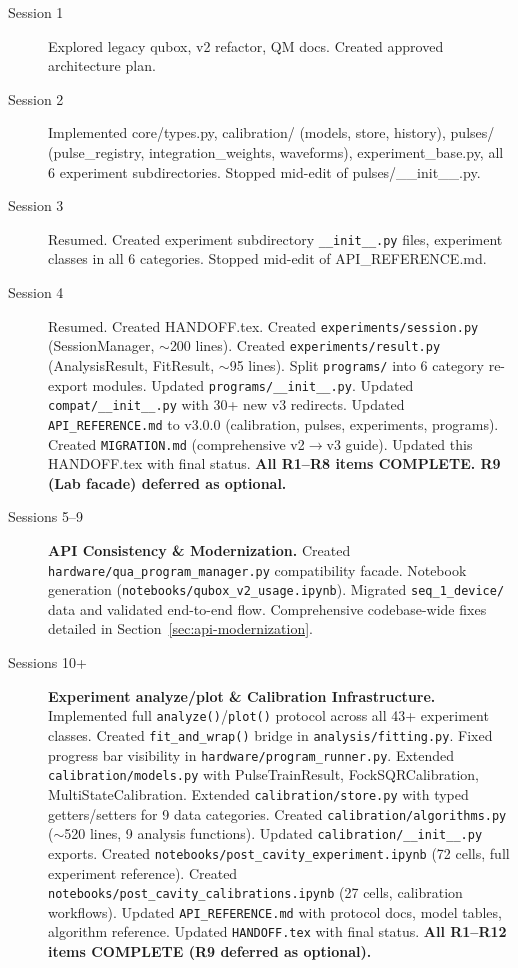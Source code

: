 \documentclass[11pt]{article}
\begin{document}
\begin{description}
  \item[Session 1] Explored legacy qubox, v2 refactor, QM docs.
        Created approved architecture plan.
  \item[Session 2] Implemented core/types.py, calibration/ (models, store, history),
        pulses/ (pulse\_registry, integration\_weights, waveforms),
        experiment\_base.py, all 6 experiment subdirectories.
        Stopped mid-edit of pulses/\_\_init\_\_.py.
  \item[Session 3] Resumed. Created experiment subdirectory \texttt{\_\_init\_\_.py}
        files, experiment classes in all 6 categories.
        Stopped mid-edit of API\_REFERENCE.md.
  \item[Session 4] Resumed. Created HANDOFF.tex.
        Created \texttt{experiments/session.py} (SessionManager, $\sim$200 lines).
        Created \texttt{experiments/result.py} (AnalysisResult, FitResult, $\sim$95 lines).
        Split \texttt{programs/} into 6 category re-export modules.
        Updated \texttt{programs/\_\_init\_\_.py}.
        Updated \texttt{compat/\_\_init\_\_.py} with 30+ new v3 redirects.
        Updated \texttt{API\_REFERENCE.md} to v3.0.0 (calibration, pulses, experiments, programs).
        Created \texttt{MIGRATION.md} (comprehensive v2$\rightarrow$v3 guide).
        Updated this HANDOFF.tex with final status.
        \textbf{All R1--R8 items COMPLETE. R9 (Lab facade) deferred as optional.}

  \item[Sessions 5--9] \textbf{API Consistency \& Modernization.}
        Created \texttt{hardware/qua\_program\_manager.py} compatibility facade.
        Notebook generation (\texttt{notebooks/qubox\_v2\_usage.ipynb}).
        Migrated \texttt{seq\_1\_device/} data and validated end-to-end flow.
        Comprehensive codebase-wide fixes detailed in Section~\ref{sec:api-modernization}.

  \item[Sessions 10+] \textbf{Experiment analyze/plot \& Calibration Infrastructure.}
        Implemented full \texttt{analyze()}/\texttt{plot()} protocol across all 43+ experiment classes.
        Created \texttt{fit\_and\_wrap()} bridge in \texttt{analysis/fitting.py}.
        Fixed progress bar visibility in \texttt{hardware/program\_runner.py}.
        Extended \texttt{calibration/models.py} with PulseTrainResult, FockSQRCalibration,
        MultiStateCalibration.
        Extended \texttt{calibration/store.py} with typed getters/setters for 9 data categories.
        Created \texttt{calibration/algorithms.py} ($\sim$520 lines, 9 analysis functions).
        Updated \texttt{calibration/\_\_init\_\_.py} exports.
        Created \texttt{notebooks/post\_cavity\_experiment.ipynb} (72 cells, full experiment reference).
        Created \texttt{notebooks/post\_cavity\_calibrations.ipynb} (27 cells, calibration workflows).
        Updated \texttt{API\_REFERENCE.md} with protocol docs, model tables, algorithm reference.
        Updated \texttt{HANDOFF.tex} with final status.
        \textbf{All R1--R12 items COMPLETE (R9 deferred as optional).}


\end{description}
\end{document}
